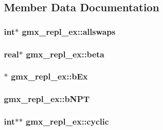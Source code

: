 \subsection{\-Member \-Data \-Documentation}
\hypertarget{structgmx__repl__ex_aede2815b408699eda305e66b65222a6b}{
\subsubsection[{allswaps}]{\setlength{\rightskip}{0pt plus 5cm}int$\ast$ {\bf gmx\-\_\-repl\-\_\-ex\-::allswaps}}}\label{structgmx__repl__ex_aede2815b408699eda305e66b65222a6b}
\hypertarget{structgmx__repl__ex_ac7250480d6ff413dfceb5798545142ed}{
\subsubsection[{beta}]{\setlength{\rightskip}{0pt plus 5cm}real$\ast$ {\bf gmx\-\_\-repl\-\_\-ex\-::beta}}}\label{structgmx__repl__ex_ac7250480d6ff413dfceb5798545142ed}
\hypertarget{structgmx__repl__ex_a45d1a7eaada3a098fbdf649d60f35823}{
\subsubsection[{b\-Ex}]{$\ast$ {\bf gmx\-\_\-repl\-\_\-ex\-::b\-Ex}}}\label{structgmx__repl__ex_a45d1a7eaada3a098fbdf649d60f35823}
\hypertarget{structgmx__repl__ex_a44fe3005f21d838b91d36c1ccebdd615}{
\subsubsection[{b\-N\-P\-T}]{ {\bf gmx\-\_\-repl\-\_\-ex\-::b\-N\-P\-T}}}\label{structgmx__repl__ex_a44fe3005f21d838b91d36c1ccebdd615}
\hypertarget{structgmx__repl__ex_adfcd451da8bd938af9d865d4ce45f4cc}{
\subsubsection[{cyclic}]{\setlength{\rightskip}{0pt plus 5cm}int$\ast$$\ast$ {\bf gmx\-\_\-repl\-\_\-ex\-::cyclic}}}\label{structgmx__repl__ex_adfcd451da8bd938af9d865d4ce45f4cc}
